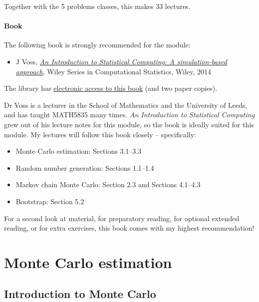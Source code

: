 \documentclass[
  letterpaper,
  DIV=11,
  numbers=noendperiod]{scrreprt}
\providecommand{\tightlist}{%
  \setlength{\itemsep}{0pt}\setlength{\parskip}{0pt}}\usepackage{longtable,booktabs,array}
\theoremstyle{plain}
\theoremstyle{definition}
\theoremstyle{definition}
\theoremstyle{remark}
\begin{document}
Together with the 5 problems classes, this makes 33 lectures.

\subsection*{Book}\label{book}

The following book is strongly recommended for the module:

\begin{itemize}
\tightlist
\item
  J Voss,
  \href{https://leeds.primo.exlibrisgroup.com/permalink/44LEE_INST/1fj430b/cdi_askewsholts_vlebooks_9781118728031}{\emph{An
  Introduction to Statistical Computing: A simulation-based approach}},
  Wiley Series in Computational Statistics, Wiley, 2014
\end{itemize}

The library has
\href{https://leeds.primo.exlibrisgroup.com/permalink/44LEE_INST/1fj430b/cdi_askewsholts_vlebooks_9781118728031}{electronic
access to this book} (and two paper copies).

Dr Voss is a lecturer in the School of Mathematics and the University of
Leeds, and has taught MATH5835 many times. \emph{An Introduction to
Statistical Computing} grew out of his lecture notes for this module, so
the book is ideally suited for this module. My lectures will follow this
book closely -- specifically:

\begin{itemize}
\item
  Monte Carlo estimation: Sections 3.1--3.3
\item
  Random number generation: Sections 1.1--1.4
\item
  Markov chain Monte Carlo: Section 2.3 and Sections 4.1--4.3
\item
  Bootstrap: Section 5.2
\end{itemize}

For a second look at material, for preparatory reading, for optional
extended reading, or for extra exercises, this book comes with my
highest recommendation!

\part{Monte Carlo estimation}

\chapter{Introduction to Monte Carlo}\label{introduction-to-monte-carlo}
\end{document}
